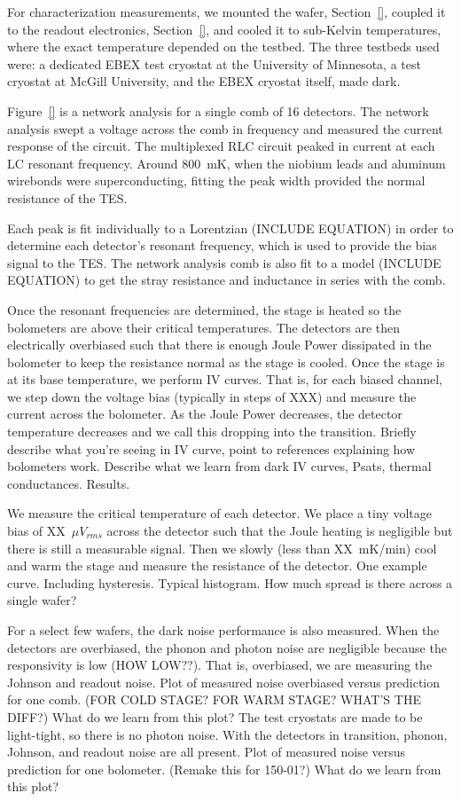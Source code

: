 For characterization measurements, we mounted the wafer, Section~\ref{}, coupled it to the readout electronics, Section~\ref{}, and cooled it to sub-Kelvin temperatures, where the exact temperature depended on the testbed. 
The three testbeds used were: a dedicated \ac{EBEX} test cryostat at the University of Minnesota, a test cryostat at McGill University, and the \ac{EBEX} cryostat itself, made dark. 

Figure~\ref{} is a network analysis for a single comb of 16 detectors. 
The network analysis swept a voltage across the comb in frequency and measured the current response of the circuit. 
The multiplexed RLC circuit peaked in current at each LC resonant frequency. 
Around 800~mK, when the niobium leads and aluminum wirebonds were superconducting, fitting the peak width provided the normal resistance of the \ac{TES}. 

Each peak is fit individually to a Lorentzian (INCLUDE EQUATION) in order to determine each detector's resonant frequency, which is used to provide the bias signal to the TES. 
The network analysis comb is also fit to a model (INCLUDE EQUATION) to get the stray resistance and inductance in series with the comb. 

Once the resonant frequencies are determined, the stage is heated so the bolometers are above their critical temperatures. 
The detectors are then electrically overbiased such that there is enough Joule Power dissipated in the bolometer to keep the resistance normal as the stage is cooled. 
Once the stage is at its base temperature, we perform IV curves. 
That is, for each biased channel, we step down the voltage bias (typically in steps of XXX) and measure the current across the bolometer. 
As the Joule Power decreases, the detector temperature decreases and we call this dropping into the transition. 
Briefly describe what you're seeing in IV curve, point to references explaining how bolometers work. 
Describe what we learn from dark IV curves, Psats, thermal conductances. 
Results. 

We measure the critical temperature of each detector. 
We place a tiny voltage bias of XX~$\mu V_{rms}$ across the detector such that the Joule heating is negligible but there is still a measurable signal. 
Then we slowly (less than XX~mK/min) cool and warm the stage and measure the resistance of the detector. 
One example curve. Including hysteresis. 
Typical histogram. How much spread is there across a single wafer?

For a select few wafers, the dark noise performance is also measured. 
When the detectors are overbiased, the phonon and photon noise are negligible because the responsivity is low (HOW LOW??). 
That is, overbiased, we are measuring the Johnson and readout noise. 
Plot of measured noise overbiased versus prediction for one comb. (FOR COLD STAGE? FOR WARM STAGE? WHAT'S THE DIFF?)
What do we learn from this plot? 
The test cryostats are made to be light-tight, so there is no photon noise. 
With the detectors in transition, phonon, Johnson, and readout noise are all present. 
Plot of measured noise versus prediction for one bolometer. (Remake this for 150-01?)
What do we learn from this plot?

